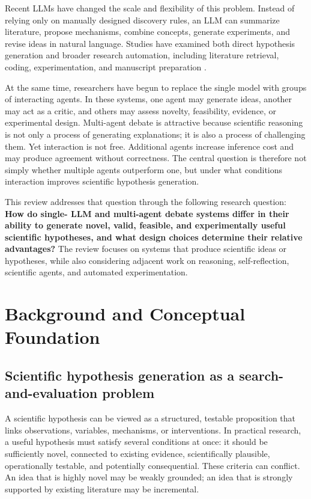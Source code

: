 \documentclass[11pt]{article}
\begin{document}
Recent LLMs have changed the scale and flexibility of this problem. Instead of relying only on
manually designed discovery rules, an LLM can summarize literature, propose mechanisms,
combine concepts, generate experiments, and revise ideas in natural language. Studies have
examined both direct hypothesis generation \cite{zhou2024hypothesis,yang2024large} and broader
research automation, including literature retrieval, coding, experimentation, and manuscript
preparation \cite{lu2024ai,yamada2026towards}.

At the same time, researchers have begun to replace the single model with groups of interacting
agents. In these systems, one agent may generate ideas, another may act as a critic, and others may
assess novelty, feasibility, evidence, or experimental design. Multi-agent debate is attractive
because scientific reasoning is not only a process of generating explanations; it is also a process of
challenging them. Yet interaction is not free. Additional agents increase inference cost and may
produce agreement without correctness. The central question is therefore not simply whether
multiple agents outperform one, but under what conditions interaction improves scientific
hypothesis generation.

This review addresses that question through the following research question: \textbf{How do single-
LLM and multi-agent debate systems differ in their ability to generate novel, valid, feasible, and
experimentally useful scientific hypotheses, and what design choices determine their relative
advantages?} The review focuses on systems that produce scientific ideas or hypotheses, while
also considering adjacent work on reasoning, self-reflection, scientific agents, and automated
experimentation.

\section{Background and Conceptual Foundation}
\label{sec:background}

\subsection{Scientific hypothesis generation as a search-and-evaluation problem}
\label{subsec:hypothesis-generation}

A scientific hypothesis can be viewed as a structured, testable proposition that links observations,
variables, mechanisms, or interventions. In practical research, a useful hypothesis must satisfy
several conditions at once: it should be sufficiently novel, connected to existing evidence,
scientifically plausible, operationally testable, and potentially consequential. These criteria can
conflict. An idea that is highly novel may be weakly grounded; an idea that is strongly supported by
existing literature may be incremental.
\end{document}
